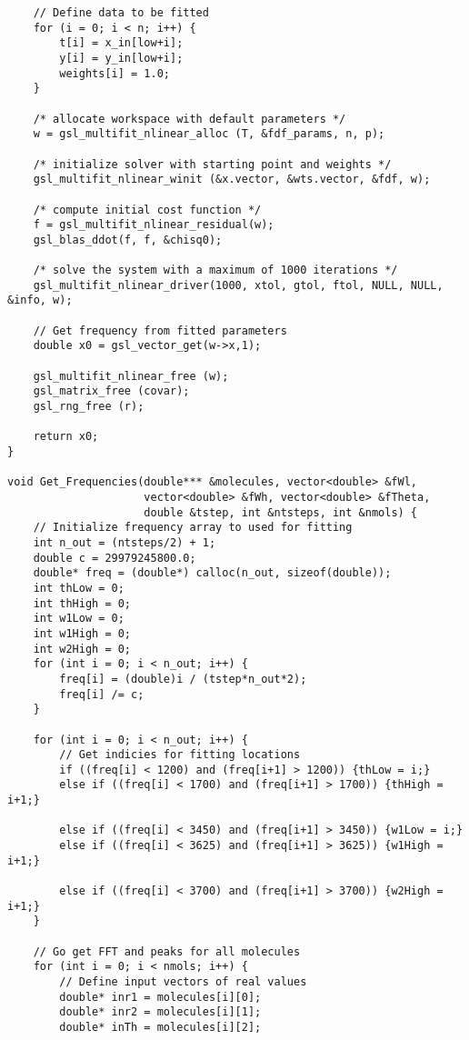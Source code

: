 \begin{singlespace}
\begin{verbatim}
    // Define data to be fitted
    for (i = 0; i < n; i++) {
        t[i] = x_in[low+i];
        y[i] = y_in[low+i];
        weights[i] = 1.0;
    }

    /* allocate workspace with default parameters */
    w = gsl_multifit_nlinear_alloc (T, &fdf_params, n, p);

    /* initialize solver with starting point and weights */
    gsl_multifit_nlinear_winit (&x.vector, &wts.vector, &fdf, w);

    /* compute initial cost function */
    f = gsl_multifit_nlinear_residual(w);
    gsl_blas_ddot(f, f, &chisq0);

    /* solve the system with a maximum of 1000 iterations */
    gsl_multifit_nlinear_driver(1000, xtol, gtol, ftol, NULL, NULL, &info, w);

    // Get frequency from fitted parameters
    double x0 = gsl_vector_get(w->x,1);

    gsl_multifit_nlinear_free (w);
    gsl_matrix_free (covar);
    gsl_rng_free (r);

    return x0;
}

void Get_Frequencies(double*** &molecules, vector<double> &fWl, 
                     vector<double> &fWh, vector<double> &fTheta, 
                     double &tstep, int &ntsteps, int &nmols) {
    // Initialize frequency array to used for fitting
    int n_out = (ntsteps/2) + 1;
    double c = 29979245800.0;
    double* freq = (double*) calloc(n_out, sizeof(double));
    int thLow = 0;
    int thHigh = 0;
    int w1Low = 0;
    int w1High = 0;
    int w2High = 0;
    for (int i = 0; i < n_out; i++) {
        freq[i] = (double)i / (tstep*n_out*2);
        freq[i] /= c;
    }

    for (int i = 0; i < n_out; i++) {
        // Get indicies for fitting locations
        if ((freq[i] < 1200) and (freq[i+1] > 1200)) {thLow = i;}
        else if ((freq[i] < 1700) and (freq[i+1] > 1700)) {thHigh = i+1;}

        else if ((freq[i] < 3450) and (freq[i+1] > 3450)) {w1Low = i;}
        else if ((freq[i] < 3625) and (freq[i+1] > 3625)) {w1High = i+1;}

        else if ((freq[i] < 3700) and (freq[i+1] > 3700)) {w2High = i+1;}
    }

    // Go get FFT and peaks for all molecules
    for (int i = 0; i < nmols; i++) {
        // Define input vectors of real values
        double* inr1 = molecules[i][0];
        double* inr2 = molecules[i][1];
        double* inTh = molecules[i][2];


\end{verbatim}
\end{singlespace}
